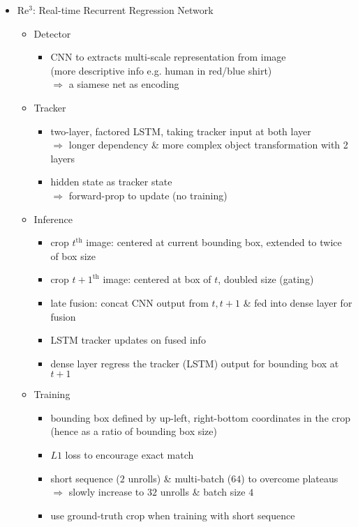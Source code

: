 \begin{itemize}
\item Re$^3$: Real-time Recurrent Regression Network
	\begin{itemize}
	\item Detector
		\begin{itemize}
		\item CNN to extracts multi-scale representation from image \\
		(more descriptive info e.g. human in red/blue shirt) \\
		$\Rightarrow$ a siamese net as encoding
		\end{itemize}
	\item Tracker
		\begin{itemize}
		\item two-layer, factored LSTM, taking tracker input at both layer \\
		$\Rightarrow$ longer dependency \& more complex object transformation with 2 layers
		\item hidden state as tracker state \\
		$\Rightarrow$ forward-prop to update (no training)
		\end{itemize}
	\item Inference
		\begin{itemize}
		\item crop $t^\text{th}$ image: centered at current bounding box, extended to twice of box size
		\item crop $t+1^\text{th}$ image: centered at box of $t$, doubled size (gating)
		\item late fusion: concat CNN output from $t, t+1$ \& fed into dense layer for fusion
		\item LSTM tracker updates on fused info
		\item dense layer regress the tracker (LSTM) output for bounding box at $t+1$
		\end{itemize}
	\item Training
		\begin{itemize}
		\item bounding box defined by up-left, right-bottom coordinates in the crop \\
		(hence as a ratio of bounding box size)
		\item $L1$ loss to encourage exact match
		\item short sequence ($2$ unrolls) \& multi-batch ($64$) to overcome plateaus \\
		$\Rightarrow$ slowly increase to $32$ unrolls \& batch size $4$
		\item use ground-truth crop when training with short sequence \\ 

\end{itemize}
\end{itemize}
\end{itemize}
